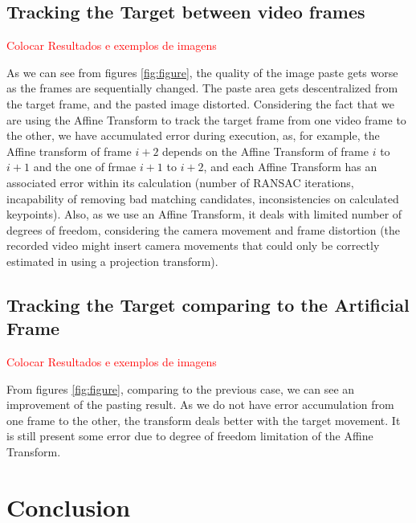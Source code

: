 \documentclass[]{IEEEtran}
\newcommand\todolist[1]{\textcolor{red}{#1}}
\begin{document}
\subsection{Tracking the Target between video frames}

\todolist{Colocar Resultados e exemplos de imagens}

As we can see from figures \ref{fig:figure}, the quality of the image paste gets worse as the frames are sequentially changed. The paste area gets descentralized from the target frame, and the pasted image distorted.
Considering the fact that we are using the Affine Transform to track the target frame from one video frame to the other, we have accumulated error during execution, as, for example, the Affine transform of frame $i + 2$ depends on the Affine Transform of frame $i$ to $i + 1$ and the one of frmae $i + 1$ to $i + 2$, and each Affine Transform has an associated error within its calculation (number of RANSAC iterations, incapability of removing bad matching candidates, inconsistencies on calculated keypoints). Also, as we use an Affine Transform, it deals with limited number of degrees of freedom, considering the camera movement and frame distortion (the recorded video might insert camera movements that could only be correctly estimated in using a projection transform).

\subsection{Tracking the Target comparing to the Artificial Frame}

\todolist{Colocar Resultados e exemplos de imagens}

From figures \ref{fig:figure}, comparing to the previous case, we can see an improvement of the pasting result. As we do not have error accumulation from one frame to the other, the transform deals better with the target movement. It is still present some error due to degree of freedom limitation of the Affine Transform. 

\section{Conclusion}
 
  
\end{document}
